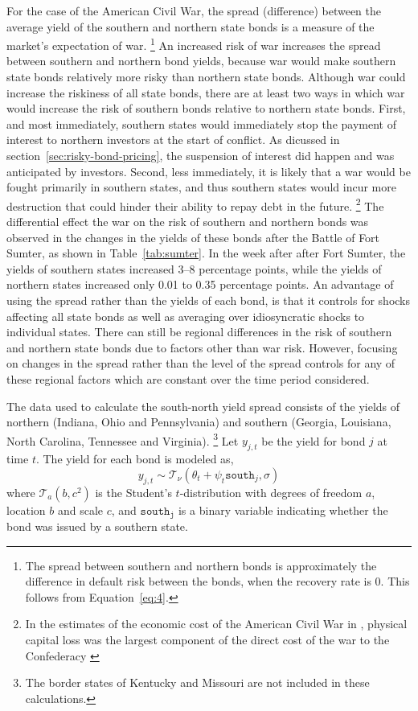 \documentclass[11pt, oneside, article]{memoir}\usepackage[]{graphicx}\usepackage[]{color}
\newcommand{\dist}[1]{\mathcal{#1}}
\newcommand{\paren}[1]{\mathopen{}\left(#1\right)\mathclose{}}
\newcommand{\distiii}[3]{\ensuremath{\dist{#1}_{#2}\paren{#3}}}
\newcommand{\dt}[2]{\distiii{T}{#1}{#2}}
\begin{document}
For the case of the American Civil War, the spread (difference) between the average yield of the southern and northern state bonds is a measure of the market's expectation of war.%
\footnote{
  The spread between southern and northern bonds is approximately the difference in default risk between the bonds, when the recovery rate is 0.
  This follows from Equation~\eqref{eq:4}.
}
An increased risk of war increases the spread between southern and northern bond yields, because war would make southern state bonds relatively more risky than northern state bonds.
Although war could increase the riskiness of all state bonds, there are at least two ways in which war would increase the risk of southern bonds relative to northern state bonds.
First, and most immediately, southern states would immediately stop the payment of interest to northern investors at the start of conflict.
As dicussed in section~\ref{sec:risky-bond-pricing}, the suspension of interest did happen and was anticipated by investors.
Second, less immediately, it is likely that a war would be fought primarily in southern states, and thus southern states would incur more destruction that could hinder their ability to repay debt in the future.%
\footnote{In the estimates of the economic cost of the American Civil War in \textcite{GoldinLewis1975}, physical capital loss was the largest component of the direct cost of the war to the Confederacy \parencite[308]{GoldinLewis1975}}
The differential effect the war on the risk of southern and northern bonds was observed in the changes in the yields of these bonds after the Battle of Fort Sumter, as shown in Table~\ref{tab:sumter}.
In the week after after Fort Sumter, the yields of southern states increased 3--8 percentage points, while the yields of northern states increased only 0.01 to 0.35 percentage points.
An advantage of using the spread rather than the yields of each bond, is that it controls for shocks affecting all state bonds as well as averaging over idiosyncratic shocks to individual states.
There can still be regional differences in the risk of southern and northern state bonds due to factors other than war risk.
However, focusing on changes in the spread rather than the level of the spread controls for any of these regional factors which are constant over the time period considered.

The data used to calculate the south-north yield spread consists of the yields of northern (Indiana, Ohio and Pennsylvania) and southern (Georgia, Louisiana, North Carolina, Tennessee and Virginia).
\footnote{The border states of Kentucky and Missouri are not included in these calculations.}
Let $y_{j,t}$ be the yield for bond $j$ at time $t$.
The yield for each bond is modeled as,
\begin{equation}
  y_{j,t} \sim \dt{\nu}{\theta_{t} + \psi_{t} \mathtt{south}_{j}, \sigma}
\end{equation}
where $\dt{a}{b, c^{2}}$ is the Student's $t$-distribution with degrees of freedom $a$, location $b$ and scale $c$, and
$\mathtt{south_{j}}$ is a binary variable indicating whether the bond was issued by a southern state.
\end{document}
